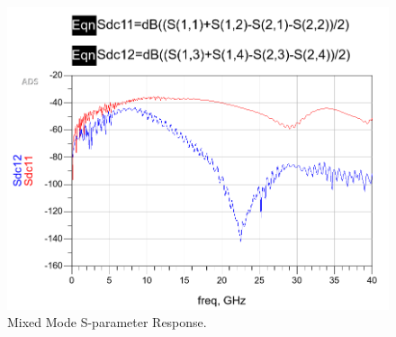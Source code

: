 \documentclass{book}  %
\begin{document}
\begin{paper}
\begin{figure}[htbp!]
\begin{minipage}[b]{0.5\linewidth}
		\includegraphics[width=\textwidth]{./img/S-parameter/mixed.png}
	\end{minipage}
	\caption{Mixed Mode S-parameter Response.}	
	\vskip0.2in	
\end{figure}


\end{paper}
\end{document}
